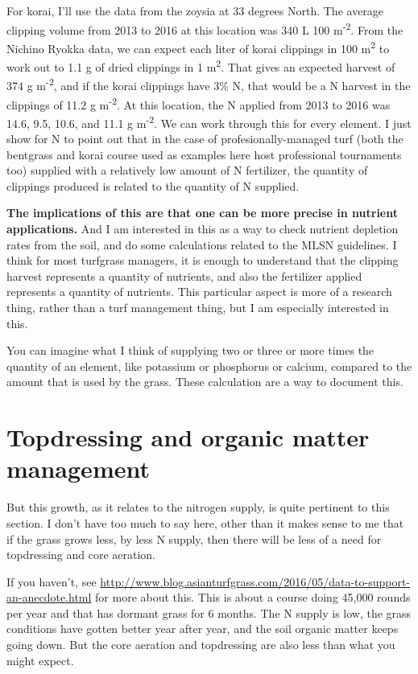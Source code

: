 \documentclass[12pt,b5,]{tufte-book}
\begin{document}
For korai, I'll use the data from the zoysia at 33 degrees North. The
average clipping volume from 2013 to 2016 at this location was 340 L 100
m\textsuperscript{-2}. From the Nichino Ryokka data, we can expect each liter of korai
clippings in 100 m\textsuperscript{2} to work out to 1.1 g of dried clippings in 1 m\textsuperscript{2}.
That gives an expected harvest of 374 g m\textsuperscript{-2}, and if the korai
clippings have 3\% N, that would be a N harvest in the clippings of 11.2
g m\textsuperscript{-2}. At this location, the N applied from 2013 to 2016 was 14.6,
9.5, 10.6, and 11.1 g m\textsuperscript{-2}. We can work through this for every element.
I just show for N to point out that in the case of profesionally-managed
turf (both the bentgrass and korai course used as examples here host
professional tournaments too) supplied with a relatively low amount of N
fertilizer, the quantity of clippings produced is related to the
quantity of N supplied.

\textbf{The implications of this are that one can be more precise in nutrient
applications.} And I am interested in this as a way to check nutrient
depletion rates from the soil, and do some calculations related to the
\textsc{MLSN} guidelines. I think
for most turfgrass managers, it is enough to understand that the
clipping harvest represents a quantity of nutrients, and also the
fertilizer applied represents a quantity of nutrients. This particular
aspect is more of a research thing, rather than a turf management thing,
but I am especially interested in this.

You can imagine what I think of supplying two or three or more times the
quantity of an element, like potassium or phosphorus or calcium,
compared to the amount that is used by the grass. These calculation are
a way to document this.

\hypertarget{topdressing-and-organic-matter-management}{%
\section{Topdressing and organic matter management}\label{topdressing-and-organic-matter-management}}

But this growth, as it relates to the nitrogen supply, is quite
pertinent to this section. I don't have too much to say here, other than
it makes sense to me that if the grass grows less, by less N supply,
then there will be less of a need for topdressing and core aeration.

If you haven't, see
\url{http://www.blog.asianturfgrass.com/2016/05/data-to-support-an-anecdote.html}
for more about this. This is about a course doing 45,000 rounds per year
and that has dormant grass for 6 months. The N supply is low, the grass
conditions have gotten better year after year, and the soil organic
matter keeps going down. But the core aeration and topdressing are also
less than what you might expect.
\end{document}
